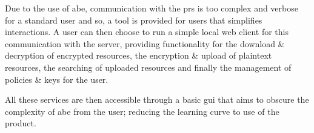 Due to the use of \acrshort{abe}, communication with the \acrshort{prs} is too complex and verbose for a standard user and so, a tool is provided for users that simplifies interactions. A user can then choose to run a simple local web client for this communication with the server, providing functionality for the download \& decryption of encrypted resources, the encryption \& upload of plaintext resources, the searching of uploaded resources and finally the management of policies \& keys for the user.

All these services are then accessible through a basic \acrshort{gui} that aims to obscure the complexity of \acrshort{abe} from the user; reducing the learning curve to use of the product.
